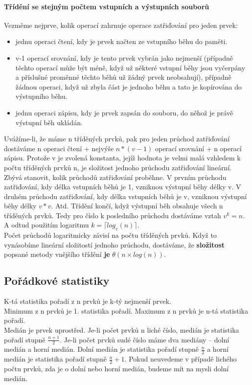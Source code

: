 \documentclass[10pt,a4paper]{article}
\begin{document}
\paragraph{Třídění se stejným počtem vstupních a výstupních souborů}
Vezměme nejprve, kolik operací zahrnuje operace zatřiďování pro jeden prvek:
\begin{itemize}
	\item jednu operaci čtení, kdy je prvek načten ze vstupního běhu do paměti.
	\item v-1 operací srovnání, kdy je tento prvek vybrán jako nejmenší (případně těchto operací může být méně, když už některé vstupní běhy jsou vyčerpány a příslušné proměnné těchto běhů už žádný prvek neobsahují), případně žádnou operaci, když už zbyla část je jednoho běhu a tato je kopírována do výstupního běhu.
	\item jednu operaci zápisu, kdy je prvek zapsán do souboru, do něhož je právě výstupní běh ukládán.
\end{itemize}
Uvážíme-li, že máme n tříděných prvků, pak pro jeden průchod zatřiďování dostáváme n operaci čtení + nejvýše $n \ast (v-1)$ operací srovnání + n operací zápisu. Protože v je zvolená konstanta, jejíž hodnota je velmi malá vzhledem k počtu tříděných prvků n, je složitost jednoho průchodu zatřiďování lineární. Zbývá stanovit, kolik průchodů zatřiďování proběhne. V prvním průchodu zatřiďování, kdy délka vstupních běhů je 1, vzniknou výstupní běhy délky v. V druhém průchodu zatřiďování, kdy délka vstupních běhů je v, vzniknou výstupní běhy délky $v \ast v$. Atd. Třídění končí, když výstupní běh obsahuje všech n tříděných prvků. Tedy pro číslo k posledního průchodu dostáváme vztah $v^k = n$. A odtud použitím logaritmu $k = \lceil log_v (n) \rceil$. \\
Počet průchodů logaritmicky závisí na počtu tříděných prvků. Když to vynásobíme lineární složitostí jednoho průchodu, dostáváme, že \textbf{složitost} popsané metody vnějšího třídění \textbf{je} $\theta (n \times log(n))$.




\subsection{Pořádkové statistiky}
K-tá statistika pořadí z n prvků je k-tý nejmenší prvek. \\
Minimum z n prvků je 1. statistika pořadí. Maximum z n prvků je n-tá statistika pořadí. \\
Medián je prvek uprostřed. Je-li počet prvků n liché číslo, medián je statistika pořadí stupně $\frac{n+1}{2}$. Je-li počet prvků sudé číslo máme dva mediány – dolní medián a horní medián. Dolní medián je statistika pořadí stupně $\frac{n}{2}$ a horní medián je statistika pořadí stupně $\frac{n}{2}+1$. Pokud neuvedeme v případě lichého počtu prvků, zda je o dolní nebo horní medián, budeme mít na mysli dolní medián. \\
\end{document}
